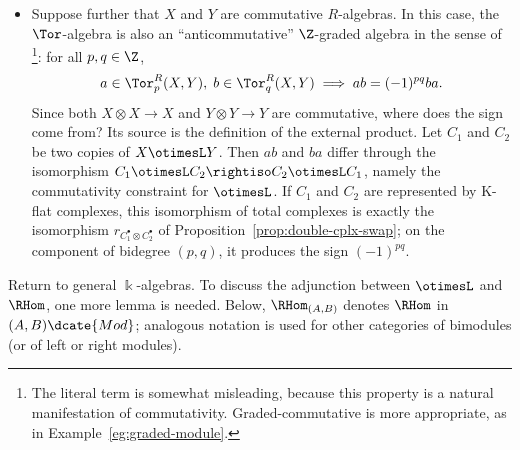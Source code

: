 \begin{example}
\begin{itemize}
		component is the subalgebra $\Tor^R_0(X,Y)=X\otimes Y$, whose definition
		may be found in \cite[Definition 7.3.1]{Li1}. The associativity required
		for the product can be verified by reducing it to the associativity
		constraint for $\otimesL$ and to the associativity of multiplication on
		$X$ and $Y$ separately.
		\item Suppose further that $X$ and $Y$ are commutative $R$-algebras. In
		this case, the $\Tor$-algebra is also an ``anticommutative''
		$\Z$-graded algebra in the sense of
		\cite[Definition 7.4.3]{Li1}\footnote{The literal term is somewhat
		misleading, because this property is a natural manifestation of
		commutativity. Graded-commutative is more appropriate, as in
		Example~\ref{eg:graded-module}.}: for all $p,q\in\Z$,
		\[ a \in \Tor^R_p(X, Y), \; b \in \Tor^R_q(X, Y) \implies ab = (-1)^{pq} ba. \]
		Since both $X\otimes X\to X$ and $Y\otimes Y\to Y$ are commutative,
		where does the sign come from? Its source is the definition of the
		external product. Let $C_1$ and $C_2$ be two copies of $X\otimesL Y$.
		Then $ab$ and $ba$ differ through the isomorphism
		$C_1\otimesL C_2\rightiso C_2\otimesL C_1$, namely the commutativity
		constraint for $\otimesL$. If $C_1$ and $C_2$ are represented by K-flat
		complexes, this isomorphism of total complexes is exactly the isomorphism
		$r_{C_1^\bullet \otimes C_2^\bullet}$ of
		Proposition~\ref{prop:double-cplx-swap}; on the component of bidegree
		$(p,q)$, it produces the sign $(-1)^{pq}$.
	\end{itemize}
\end{example}

Return to general $\Bbbk$-algebras. To discuss the adjunction between
$\otimesL$ and $\RHom$, one more lemma is needed. Below,
$\RHom_{(A,B)}$ denotes $\RHom$ in $(A,B)\dcate{Mod}$; analogous notation is
used for other categories of bimodules (or of left or right modules).

